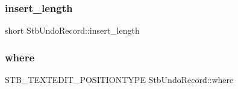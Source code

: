 \hypertarget{struct_stb_undo_record_ae2a3af79db791549db0c42263407cab5}{}\label{struct_stb_undo_record_ae2a3af79db791549db0c42263407cab5} 
\subsubsection{\texorpdfstring{insert\+\_\+length}{insert\_length}}
{\footnotesize\ttfamily short Stb\+Undo\+Record\+::insert\+\_\+length}

\hypertarget{struct_stb_undo_record_a49e87adbb75a18ffba1f853ac974b31d}{}\label{struct_stb_undo_record_a49e87adbb75a18ffba1f853ac974b31d} 
\subsubsection{\texorpdfstring{where}{where}}
{\footnotesize\ttfamily S\+T\+B\+\_\+\+T\+E\+X\+T\+E\+D\+I\+T\+\_\+\+P\+O\+S\+I\+T\+I\+O\+N\+T\+Y\+PE Stb\+Undo\+Record\+::where}

